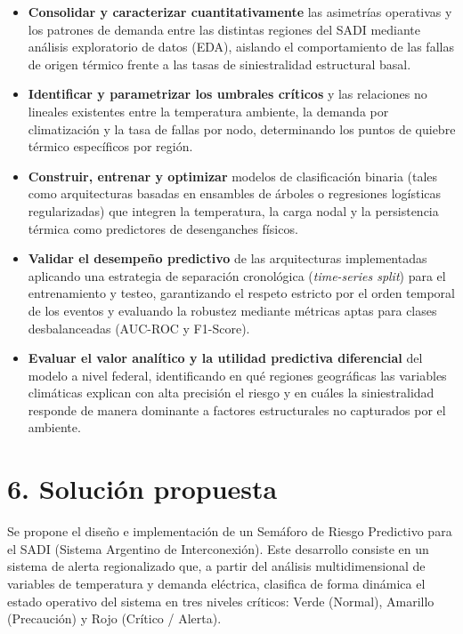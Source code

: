 \begin{itemize}
\item
  \textbf{Consolidar y caracterizar cuantitativamente} las asimetrías operativas y los patrones de demanda entre las distintas regiones del SADI mediante análisis exploratorio de datos (EDA), aislando el comportamiento de las fallas de origen térmico frente a las tasas de siniestralidad estructural basal.
\item
  \textbf{Identificar y parametrizar los umbrales críticos} y las relaciones no lineales existentes entre la temperatura ambiente, la demanda por climatización y la tasa de fallas por nodo, determinando los puntos de quiebre térmico específicos por región.
\item
  \textbf{Construir, entrenar y optimizar} modelos de clasificación binaria (tales como arquitecturas basadas en ensambles de árboles o regresiones logísticas regularizadas) que integren la temperatura, la carga nodal y la persistencia térmica como predictores de desenganches físicos.
\item
  \textbf{Validar el desempeño predictivo} de las arquitecturas implementadas aplicando una estrategia de separación cronológica (\emph{time-series split}) para el entrenamiento y testeo, garantizando el respeto estricto por el orden temporal de los eventos y evaluando la robustez mediante métricas aptas para clases desbalanceadas (AUC-ROC y F1-Score).
\item
  \textbf{Evaluar el valor analítico y la utilidad predictiva diferencial} del modelo a nivel federal, identificando en qué regiones geográficas las variables climáticas explican con alta precisión el riesgo y en cuáles la siniestralidad responde de manera dominante a factores estructurales no capturados por el ambiente.
\end{itemize}

\hypertarget{soluciuxf3n-propuesta}{%
\section{6. Solución propuesta}\label{soluciuxf3n-propuesta}}

Se propone el diseño e implementación de un Semáforo de Riesgo Predictivo para el SADI (Sistema Argentino de Interconexión). Este desarrollo consiste en un sistema de alerta regionalizado que, a partir del análisis multidimensional de variables de temperatura y demanda eléctrica, clasifica de forma dinámica el estado operativo del sistema en tres niveles críticos: Verde (Normal), Amarillo (Precaución) y Rojo (Crítico / Alerta).

